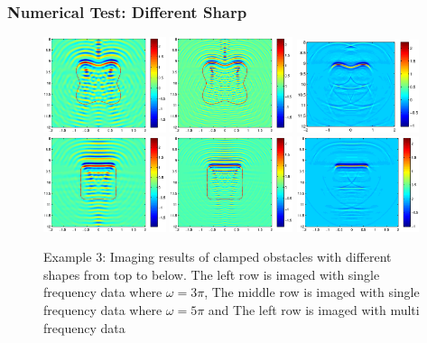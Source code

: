 \documentclass[cjk,8pt]{beamer}
\newcommand{\om}{\omega}
\begin{document}
\begin{CJK*}{GBK}{kai}
\begin{frame}
\frametitle{Numerical Test: Different Sharp}
\begin{figure}[h]
    \centering
	\includegraphics[width=0.32\textwidth]{./graphic/p_leaf_3pi.eps}
	\includegraphics[width=0.32\textwidth]{./graphic/p_leaf_5pi.eps}
	\includegraphics[width=0.32\textwidth]{./graphic/p_leaf.eps}\\
	\includegraphics[width=0.32\textwidth]{./graphic/rectangle_3pi.eps}
	\includegraphics[width=0.32\textwidth]{./graphic/rectangle_5pi.eps}
	\includegraphics[width=0.32\textwidth]{./graphic/rectangle.eps}
\caption{Example 3: Imaging results of clamped obstacles
		with different shapes from top to below. The left row is imaged with single frequency data where $\om=3\pi$, The middle row is imaged with single frequency data where $\om=5\pi$ and The left row is imaged with multi frequency data}
\end{figure}
\end{frame}



\end{CJK*}
\end{document}
